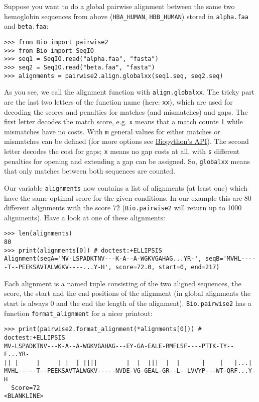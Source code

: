 Suppose you want to do a global pairwise alignment between the same two
hemoglobin sequences from above (\texttt{HBA\_HUMAN}, \texttt{HBB\_HUMAN})
stored in \texttt{alpha.faa} and \texttt{beta.faa}:

\begin{verbatim}
>>> from Bio import pairwise2
>>> from Bio import SeqIO
>>> seq1 = SeqIO.read("alpha.faa", "fasta")
>>> seq2 = SeqIO.read("beta.faa", "fasta")
>>> alignments = pairwise2.align.globalxx(seq1.seq, seq2.seq)
\end{verbatim}

As you see, we call the alignment function with \verb|align.globalxx|. The tricky
part are the last two letters of the function name (here: \texttt{xx}), which are
used for  decoding the scores and penalties for matches (and mismatches) and gaps.
The first letter decodes the match score, e.g. \texttt{x} means that a match counts
1 while mismatches have no costs. With \texttt{m} general values for either matches
or mismatches can be defined
(for more options see \href{http://biopython.org/docs/1.77/api/Bio.pairwise2.html}{Biopython's API}).
The second letter decodes the cost for gaps; \texttt{x} means no gap costs at all,
with \texttt{s} different penalties for opening and extending a gap can be assigned.
So, \verb|globalxx| means that only matches between both sequences are counted.

Our variable \texttt{alignments} now contains a list of alignments (at least one) which
have the same optimal score for the given conditions. In our example this are 80
different alignments with the score 72 (\verb|Bio.pairwise2| will return up to 1000
alignments). Have a look at one of these alignments:

\begin{verbatim}
>>> len(alignments)
80
>>> print(alignments[0]) # doctest:+ELLIPSIS
Alignment(seqA='MV-LSPADKTNV---K-A--A-WGKVGAHAG...YR-', seqB='MVHL-----T--PEEKSAVTALWGKV----...Y-H', score=72.0, start=0, end=217)
\end{verbatim}

Each alignment is a named tuple consisting of the two aligned sequences, the score, the
start and the end positions of the alignment (in global alignments the start is
always 0 and the end the length of the alignment). \verb|Bio.pairwise2| has a
function \verb|format_alignment| for a nicer printout:

\begin{verbatim}
>>> print(pairwise2.format_alignment(*alignments[0])) # doctest:+ELLIPSIS
MV-LSPADKTNV---K-A--A-WGKVGAHAG---EY-GA-EALE-RMFLSF----PTTK-TY--F...YR-
|| |     |     | |  | ||||        |  |  |||  |  |      |    |   |...|  
MVHL-----T--PEEKSAVTALWGKV-----NVDE-VG-GEAL-GR--L--LVVYP---WT-QRF...Y-H
  Score=72
<BLANKLINE>
\end{verbatim}

